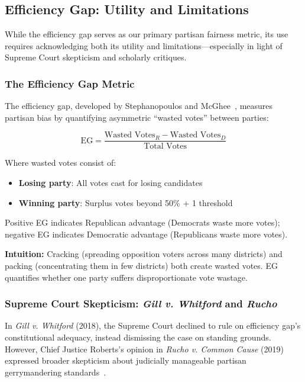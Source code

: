 \subsection{Efficiency Gap: Utility and Limitations}
\label{sec:eg-limitations}

While the efficiency gap serves as our primary partisan fairness metric, its use requires acknowledging both its utility and limitations---especially in light of Supreme Court skepticism and scholarly critiques.

\subsubsection{The Efficiency Gap Metric}

The efficiency gap, developed by Stephanopoulos and McGhee~\cite{stephanopoulos2015partisan}, measures partisan bias by quantifying asymmetric ``wasted votes'' between parties:

\begin{equation}
\text{EG} = \frac{\text{Wasted Votes}_R - \text{Wasted Votes}_D}{\text{Total Votes}}
\end{equation}

Where wasted votes consist of:
\begin{itemize}
    \item \textbf{Losing party}: All votes cast for losing candidates
    \item \textbf{Winning party}: Surplus votes beyond 50\% $+$ 1 threshold
\end{itemize}

Positive EG indicates Republican advantage (Democrats waste more votes); negative EG indicates Democratic advantage (Republicans waste more votes).

\textbf{Intuition:} Cracking (spreading opposition voters across many districts) and packing (concentrating them in few districts) both create wasted votes. EG quantifies whether one party suffers disproportionate vote wastage.

\subsubsection{Supreme Court Skepticism: \emph{Gill v. Whitford} and \emph{Rucho}}

In \emph{Gill v. Whitford} (2018), the Supreme Court declined to rule on efficiency gap's constitutional adequacy, instead dismissing the case on standing grounds. However, Chief Justice Roberts's opinion in \emph{Rucho v. Common Cause} (2019) expressed broader skepticism about judicially manageable partisan gerrymandering standards~\cite{rucho2019}.

